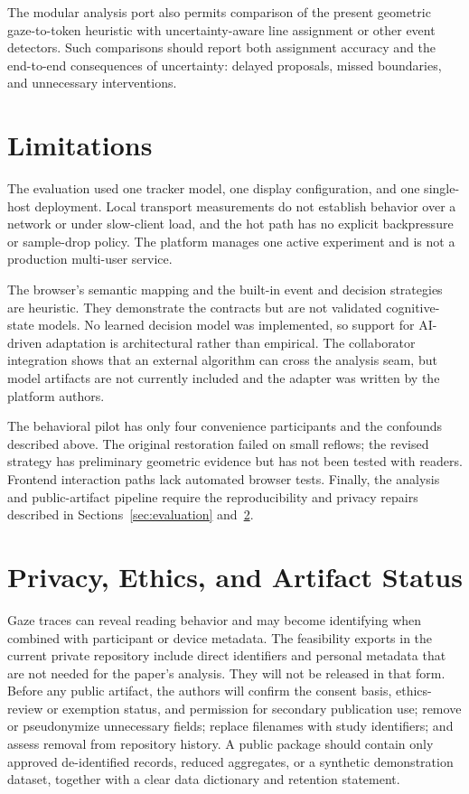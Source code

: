 \documentclass[sigconf,review,anonymous]{acmart}
\begin{document}
The modular analysis port also permits comparison of the present geometric gaze-to-token heuristic with uncertainty-aware line assignment or other event detectors.
Such comparisons should report both assignment accuracy and the end-to-end consequences of uncertainty: delayed proposals, missed boundaries, and unnecessary interventions.

\section{Limitations}

The evaluation used one tracker model, one display configuration, and one single-host deployment.
Local transport measurements do not establish behavior over a network or under slow-client load, and the hot path has no explicit backpressure or sample-drop policy.
The platform manages one active experiment and is not a production multi-user service.

The browser's semantic mapping and the built-in event and decision strategies are heuristic.
They demonstrate the contracts but are not validated cognitive-state models.
No learned decision model was implemented, so support for AI-driven adaptation is architectural rather than empirical.
The collaborator integration shows that an external algorithm can cross the analysis seam, but model artifacts are not currently included and the adapter was written by the platform authors.

The behavioral pilot has only four convenience participants and the confounds described above.
The original restoration failed on small reflows; the revised strategy has preliminary geometric evidence but has not been tested with readers.
Frontend interaction paths lack automated browser tests.
Finally, the analysis and public-artifact pipeline require the reproducibility and privacy repairs described in Sections~\ref{sec:evaluation} and~\ref{sec:ethics}.

\section{Privacy, Ethics, and Artifact Status}
\label{sec:ethics}

Gaze traces can reveal reading behavior and may become identifying when combined with participant or device metadata.
The feasibility exports in the current private repository include direct identifiers and personal metadata that are not needed for the paper's analysis.
They will not be released in that form.
Before any public artifact, the authors will confirm the consent basis, ethics-review or exemption status, and permission for secondary publication use; remove or pseudonymize unnecessary fields; replace filenames with study identifiers; and assess removal from repository history.
A public package should contain only approved de-identified records, reduced aggregates, or a synthetic demonstration dataset, together with a clear data dictionary and retention statement.
\end{document}
